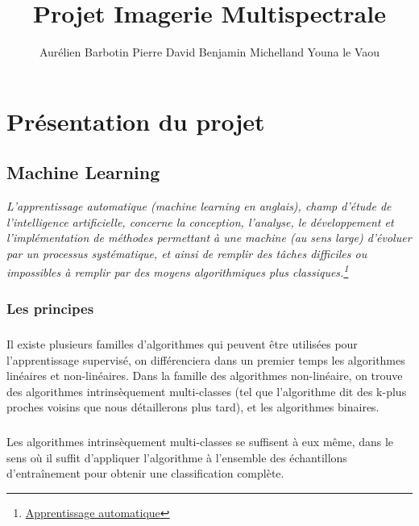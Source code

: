 \documentclass[a4paper,10pt]{report}
\begin{document}
\title{Projet Imagerie Multispectrale}
\author{Aurélien Barbotin Pierre David Benjamin Michelland Youna le Vaou}

\maketitle

\chapter{Présentation du projet}

\section{Machine Learning}
\textit{L'apprentissage automatique (machine learning en anglais), champ d'étude de l'intelligence artificielle, concerne la conception, l'analyse, le développement et l'implémentation de méthodes permettant à une machine (au sens large) d'évoluer par un processus systématique, et ainsi de remplir des tâches difficiles ou impossibles à remplir par des moyens algorithmiques plus classiques.\footnote{\href{https://fr.wikipedia.org/wiki/Apprentissage_automatique}{Apprentissage automatique}}}
\subsection{Les principes}
\paragraph{}
Il existe plusieurs familles d'algorithmes qui peuvent être utilisées pour l'apprentissage supervisé, on différenciera dans un premier temps les algorithmes linéaires et non-linéaires. Dans la famille des algorithmes non-linéaire, on trouve des algorithmes intrinsèquement multi-classes (tel que l'algorithme dit des k-plus proches voisins que nous détaillerons plus tard), et les algorithmes binaires.

\paragraph{}
Les algorithmes intrinsèquement multi-classes se suffisent à eux même, dans le sens où il suffit d'appliquer l'algorithme à l'ensemble des échantillons d'entraînement pour obtenir une classification complète.
\end{document}
